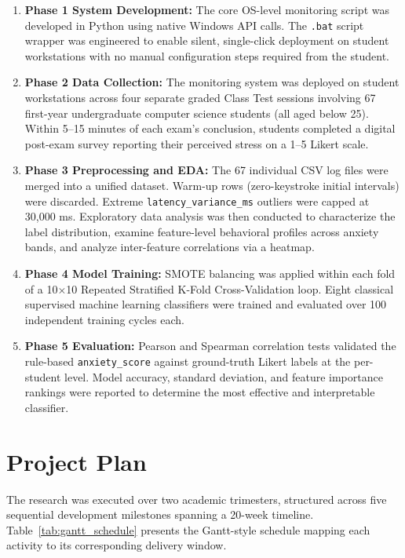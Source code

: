 \begin{enumerate}
    \item \textbf{Phase 1  System Development:} The core OS-level monitoring script was developed in Python using native Windows API calls. The \texttt{.bat} script wrapper was engineered to enable silent, single-click deployment on student workstations with no manual configuration steps required from the student.

    \item \textbf{Phase 2 Data Collection:} The monitoring system was deployed on student workstations across four separate graded Class Test sessions involving 67 first-year undergraduate computer science students (all aged below 25). Within 5--15 minutes of each exam's conclusion, students completed a digital post-exam survey reporting their perceived stress on a 1--5 Likert scale.

    \item \textbf{Phase 3  Preprocessing and EDA:} The 67 individual CSV log files were merged into a unified dataset. Warm-up rows (zero-keystroke initial intervals) were discarded. Extreme \texttt{latency\_variance\_ms} outliers were capped at 30,000 ms. Exploratory data analysis was then conducted to characterize the label distribution, examine feature-level behavioral profiles across anxiety bands, and analyze inter-feature correlations via a heatmap.

    \item \textbf{Phase 4  Model Training:} SMOTE balancing was applied within each fold of a 10$\times$10 Repeated Stratified K-Fold Cross-Validation loop. Eight classical supervised machine learning classifiers were trained and evaluated over 100 independent training cycles each.

    \item \textbf{Phase 5  Evaluation:} Pearson and Spearman correlation tests validated the rule-based \texttt{anxiety\_score} against ground-truth Likert labels at the per-student level. Model accuracy, standard deviation, and feature importance rankings were reported to determine the most effective and interpretable classifier.
\end{enumerate}

\section{Project Plan}
\label{sec:project_plan}

The research was executed over two academic trimesters, structured across five sequential development milestones spanning a 20-week timeline. Table~\ref{tab:gantt_schedule} presents the Gantt-style schedule mapping each activity to its corresponding delivery window.

